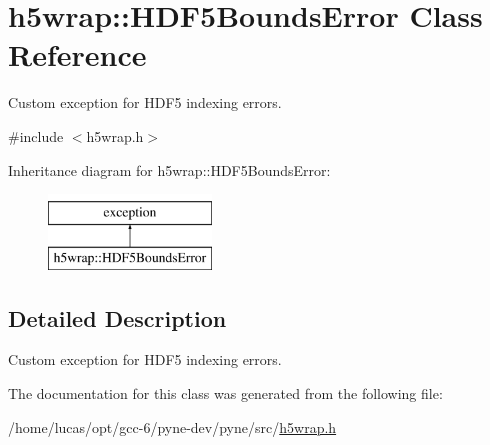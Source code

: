 \hypertarget{classh5wrap_1_1_h_d_f5_bounds_error}{}\section{h5wrap\+:\+:H\+D\+F5\+Bounds\+Error Class Reference}
\label{classh5wrap_1_1_h_d_f5_bounds_error}


Custom exception for H\+D\+F5 indexing errors.  




{\ttfamily \#include $<$h5wrap.\+h$>$}

Inheritance diagram for h5wrap\+:\+:H\+D\+F5\+Bounds\+Error\+:\begin{figure}[H]
\begin{center}
\leavevmode
\includegraphics[height=2.000000cm]{classh5wrap_1_1_h_d_f5_bounds_error}
\end{center}
\end{figure}


\subsection{Detailed Description}
Custom exception for H\+D\+F5 indexing errors. 

The documentation for this class was generated from the following file\+:\begin{DoxyCompactItemize}
\item 
/home/lucas/opt/gcc-\/6/pyne-\/dev/pyne/src/\hyperlink{h5wrap_8h}{h5wrap.\+h}\end{DoxyCompactItemize}
